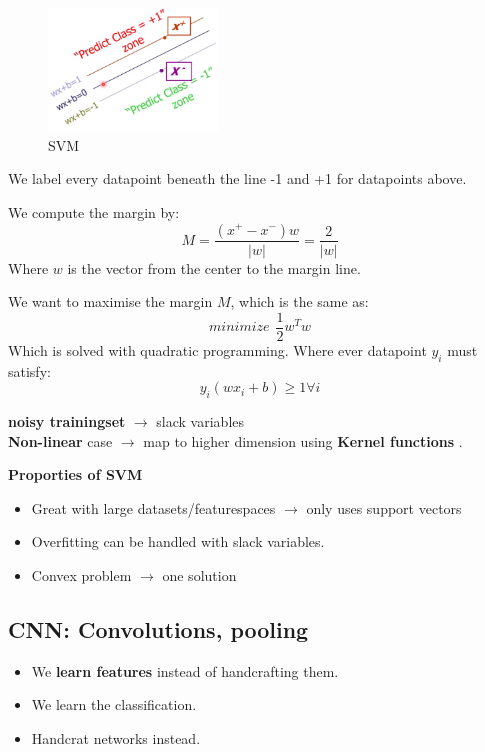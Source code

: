 \documentclass[a4paper]{article}
\begin{document}
\begin{figure}[H]
\centering
\includegraphics[width=0.4\textwidth]{figures/SVM.png}
\caption{SVM }
\label{fig:}
\end{figure} 
We label every datapoint beneath the line -1 and +1 for datapoints above. 

We compute the margin by:
\begin{equation}
M = \frac{(x^{+} - x^{-}  )w}{|w|} = \frac{2}{|w|}   
\end{equation}
Where $ w $ is the vector from the center to the margin line. 

We want to maximise the margin $ M $, which is the same as:
 \begin{equation}
	 minimize \hspace{5pt} \frac{1}{2} w^{T} w
\end{equation}
Which is solved with quadratic programming. Where ever datapoint $ y_i $ must satisfy:
\begin{equation}
y_i(w x_i + b) \geq 1 \forall i
\end{equation}

\textbf{noisy trainingset} $ \rightarrow $ slack variables \\

\textbf{Non-linear} case $ \rightarrow $ map to higher dimension using  \textbf{Kernel functions} .


\textbf{Proporties of SVM} 
\begin{itemize}
	\item Great with large datasets/featurespaces $ \rightarrow $ only uses support vectors
	\item Overfitting can be handled with slack variables.
	\item Convex problem $ \rightarrow $ one solution
\end{itemize}


\newpage
\subsection{CNN: Convolutions, pooling}
\begin{itemize}
	\item We \textbf{learn features} instead of handcrafting them.
	\item We learn the classification.
	\item Handcrat networks instead.
\end{itemize}
\end{document}
